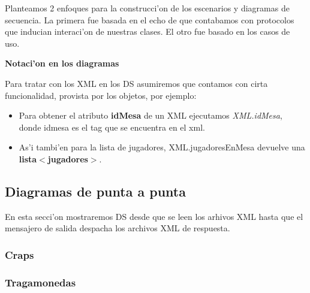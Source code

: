 Planteamos 2 enfoques para la construcci'on de los escenarios y diagramas de secuencia. La primera 
fue basada en el echo de que contabamos con protocolos que inducian interaci'on de
nuestras clases. El otro fue basado en los casos de uso.

\textbf{Notaci'on en los diagramas}

Para tratar con los XML en los DS asumiremos que contamos con cirta funcionalidad, provista por los objetos, por ejemplo:
\begin{itemize}
\item  Para obtener el atributo \textbf{idMesa} de un XML ejecutamos \textit{XML.idMesa}, donde idmesa es el tag que se encuentra en el xml.
\item As'i tambi'en para la lista de jugadores, XML.jugadoresEnMesa devuelve una \textbf{lista$<$jugadores$>$}.
\end{itemize}







\subsection{Diagramas de punta a punta}
En esta secci'on mostraremos DS desde que se leen los arhivos XML hasta que el mensajero de salida despacha los archivos
XML de respuesta.

\subsubsection{Craps}


\subsubsection{Tragamonedas}



